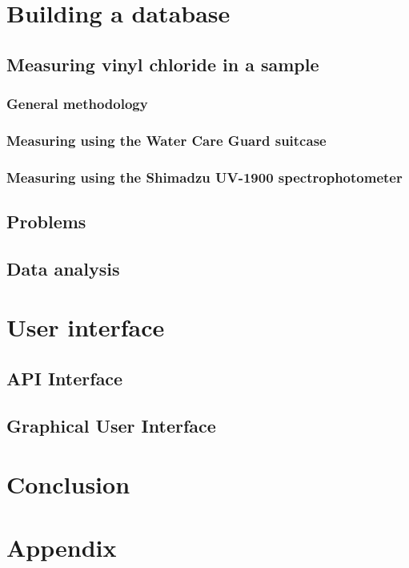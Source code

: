\documentclass{article}
\begin{document}
\newpage
\section{Building a database}
\subsection{Measuring vinyl chloride in a sample}
\subsubsection{General methodology}
\subsubsection{Measuring using the Water Care Guard suitcase}
\subsubsection{Measuring using the Shimadzu UV-1900 spectrophotometer}
\subsection{Problems}
\subsection{Data analysis}

\newpage
\section{User interface}
\subsection{API Interface}
\subsection{Graphical User Interface}

\newpage
\section{Conclusion}

\newpage

\printbibliography

\section{Appendix}
\end{document}
